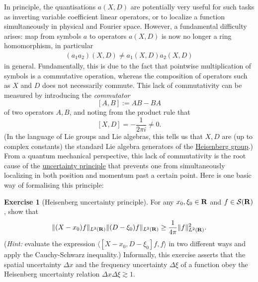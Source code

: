 \documentclass[11pt]{article}
\theoremstyle{definition}
\newtheorem{exercise}[theorem]{Exercise}
\theoremstyle{remark}
\begin{document}
In principle, the quantisations \({a(X,D)}\) are potentially very useful for such tasks as inverting variable coefficient linear operators, or to localize a function simultaneously in physical and Fourier space. However, a fundamental difficulty arises: map from symbols \({a}\) to operators \({a(X,D)}\) is now no longer a ring homomorphism, in particular 
\begin{align}\label{ringho}
  (a_1 a_2)(X,D) \neq a_1(X,D) a_2(X,D) 
\end{align}
 in general. Fundamentally, this is due to the fact that pointwise multiplication of symbols is a commutative operation, whereas the composition of operators such as \({X}\) and \({D}\) does not necessarily commute. This lack of commutativity can be measured by introducing the \emph{commutator} 
\[\displaystyle  [A,B] := AB - BA\]
 of two operators \({A,B}\), and noting from the product rule that 
\[\displaystyle  [X,D] = -\frac{1}{2\pi i} \neq 0.\]
 (In the language of Lie groups and Lie algebras, this tells us that \({X,D}\) are (up to complex constants) the standard Lie algebra generators of the \href{https://en.wikipedia.org/wiki/Heisenberg_group}{Heisenberg group}.) From a quantum mechanical perspective, this lack of commutativity is the root cause of the \href{https://en.wikipedia.org/wiki/Uncertainty_principle}{uncertainty principle} that prevents one from simultaneously localizing in both position and momentum past a certain point. Here is one basic way of formalising this principle:
\begin{exercise}[Heisenberg uncertainty principle]
 \label{hup} For any \({x_0, \xi_0 \in {\bf R}}\) and \({f \in \mathcal{S}({\bf R})}\), show that 
\[\displaystyle  \| (X-x_0) f \|_{L^2({\bf R})} \| (D-\xi_0) f\|_{L^2({\bf R})} \geq \frac{1}{4\pi} \|f\|_{L^2({\bf R})}^2.\]
 (\emph{Hint:} evaluate the expression \({\langle [X-x_0, D - \xi_0] f, f \rangle}\) in two different ways and apply the Cauchy-Schwarz inequality.) Informally, this exercise asserts that the spatial uncertainty \({\Delta x}\) and the frequency uncertainty \({\Delta \xi}\) of a function obey the Heisenberg uncertainty relation \({\Delta x \Delta \xi \gtrsim 1}\). 
\end{exercise}
\end{document}

